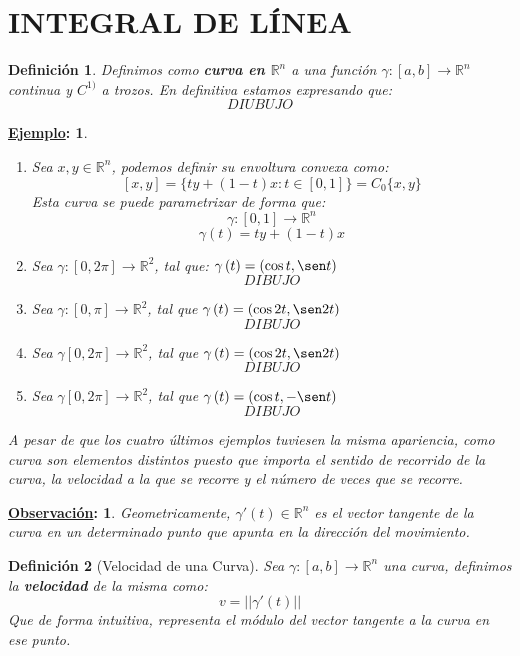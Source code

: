 \documentclass[10pt,a4paper,openright]{book}
\theoremstyle{break}
\newtheorem*{defi}{Definición}
\newtheorem*{obs}{\underline{Observación}:}
\newtheorem*{ej}{\underline{Ejemplo}:}
\begin{document}
\chapter*{INTEGRAL DE LÍNEA}
\begin{defi}
Definimos como \textbf{curva en $\mathbb{R}^n$} a una función $\gamma: \left[ a, b \right] \rightarrow \mathbb{R}^n$ continua y $C^{1)}$ a trozos. En definitiva estamos expresando que:
$$DIUBUJO$$
\end{defi}

\begin{ej}
\begin{enumerate}
    \item Sea $x, y \in \mathbb{R}^n$, podemos definir su envoltura convexa como: 
    $$\left[ x, y \right] = \{ty + \left( 1 - t \right) x: t \in \left[ 0, 1 \right]\} = C_0 \{x, y\}$$
    Esta curva se puede parametrizar de forma que:
    $$\gamma: \left[ 0, 1 \right] \rightarrow\mathbb{R}^n$$
    $$\gamma \left( t \right) = ty + \left( 1 - t \right) x$$

    \item Sea $\gamma: \left[ 0, 2\pi \right] \rightarrow \mathbb{R}^2$, tal que: $\gamma\left( t \right) = \left( \cos t, \sen t \right) $
    $$DIBUJO$$
    \item Sea $\gamma: \left[ 0, \pi \right] \rightarrow \mathbb{R}^2$, tal que $\gamma\left( t \right) = \left( \cos 2t, \sen 2t \right)$
    $$DIBUJO$$
    \item Sea $\gamma \left[ 0, 2\pi \right] \rightarrow \mathbb{R}^2$, tal que $\gamma \left( t \right) = \left( \cos 2t, \sen 2t \right)$
    $$DIBUJO$$
    \item Sea $\gamma \left[ 0, 2\pi \right] \rightarrow \mathbb{R}^2$, tal que $\gamma \left( t \right) = \left( \cos t, -\sen t \right) $
    $$DIBUJO$$ 
\end{enumerate}
A pesar de que los cuatro últimos ejemplos tuviesen la misma apariencia, como curva son elementos distintos puesto que importa el sentido de recorrido de la curva, la velocidad a la que se recorre y el número de veces que se recorre.
\end{ej}

\begin{obs}
Geometricamente, $\gamma'\left( t \right) \in \mathbb{R}^n$ es el vector tangente de la curva en un determinado punto que apunta en la dirección del movimiento.
\end{obs}

\begin{defi}[Velocidad de una Curva]
Sea $\gamma:[a,b]\rightarrow \mathbb{R}^n$ una curva, definimos la \textbf{velocidad} de la misma como: 
$$v = \lvert \lvert \gamma'\left( t \right) \rvert \rvert$$
Que de forma intuitiva, representa el módulo del vector tangente a la curva en ese punto.
\end{defi}
\end{document}
